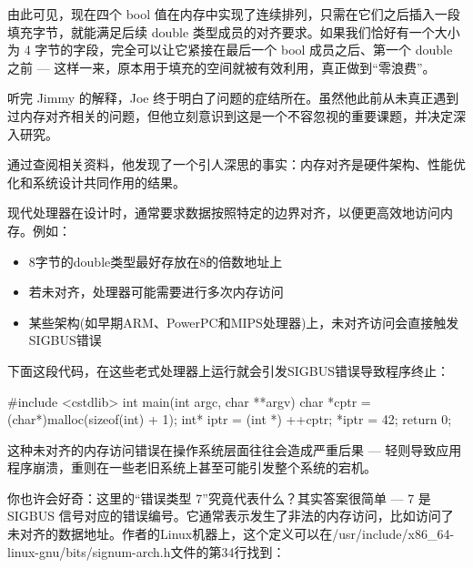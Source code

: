 
由此可见，现在四个 bool 值在内存中实现了连续排列，只需在它们之后插入一段填充字节，就能满足后续 double 类型成员的对齐要求。如果我们恰好有一个大小为 4 字节的字段，完全可以让它紧接在最后一个 bool 成员之后、第一个 double 之前 --- 这样一来，原本用于填充的空间就被有效利用，真正做到“零浪费”。

听完 Jimmy 的解释，Joe 终于明白了问题的症结所在。虽然他此前从未真正遇到过内存对齐相关的问题，但他立刻意识到这是一个不容忽视的重要课题，并决定深入研究。

通过查阅相关资料，他发现了一个引人深思的事实：内存对齐是硬件架构、性能优化和系统设计共同作用的结果。

现代处理器在设计时，通常要求数据按照特定的边界对齐，以便更高效地访问内存。例如：

\begin{itemize}
\item 
8字节的double类型最好存放在8的倍数地址上

\item 
若未对齐，处理器可能需要进行多次内存访问

\item 
某些架构(如早期ARM、PowerPC和MIPS处理器)上，未对齐访问会直接触发SIGBUS错误
\end{itemize}

下面这段代码，在这些老式处理器上运行就会引发SIGBUS错误导致程序终止：

\begin{cpp}
#include <cstdlib>
  int main(int argc, char **argv) {
  char *cptr = (char*)malloc(sizeof(int) + 1);
  int* iptr = (int *) ++cptr;
  *iptr = 42;
  return 0;
}
\end{cpp}

这种未对齐的内存访问错误在操作系统层面往往会造成严重后果 --- 轻则导致应用程序崩溃，重则在一些老旧系统上甚至可能引发整个系统的宕机。


你也许会好奇：这里的“错误类型 7”究竟代表什么？其实答案很简单 --- 7 是 SIGBUS 信号对应的错误编号。它通常表示发生了非法的内存访问，比如访问了未对齐的数据地址。作者的Linux机器上，这个定义可以在/usr/include/x86\_64-linux-gnu/bits/signum-arch.h文件的第34行找到：

